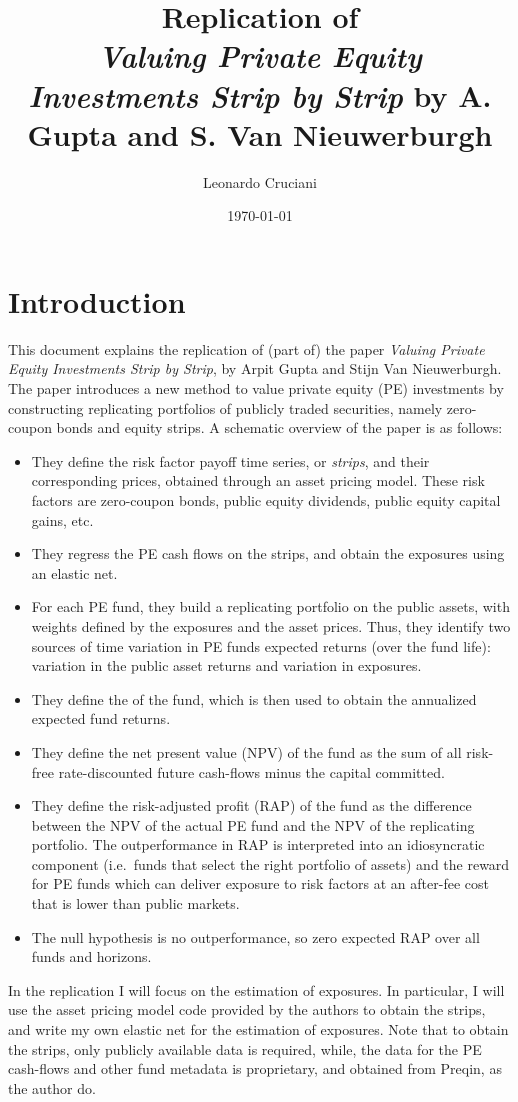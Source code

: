 \documentclass[12pt]{article}
\title{Replication of\\\textit{Valuing Private Equity Investments Strip by Strip} by A. Gupta and S. Van Nieuwerburgh}
\author{Leonardo Cruciani}
\date{\today}
\begin{document}
\maketitle

\section{Introduction}\label{sec:introduction}
This document explains the replication of (part of) the paper \textit{Valuing Private Equity Investments Strip by Strip}, by Arpit Gupta and Stijn Van Nieuwerburgh.
The paper introduces a new method to value private equity (PE) investments by constructing replicating portfolios of publicly traded securities, namely zero-coupon bonds and equity strips.
A schematic overview of the paper is as follows:
\begin{itemize}
    \item They define the risk factor payoff time series, or \textit{strips}, and their corresponding prices, obtained through an asset pricing model.
    These risk factors are zero-coupon bonds, public equity dividends, public equity capital gains, etc.
    \item They regress the PE cash flows on the strips, and obtain the exposures using an elastic net.
    \item For each PE fund, they build a replicating portfolio on the public assets, with weights defined by the exposures and the asset prices.
    Thus, they identify two sources of time variation in PE funds expected returns (over the fund life): variation in the public asset returns and variation in exposures.
    \item They define the  of the fund, which is then used to obtain the annualized expected fund returns.
    \item They define the net present value (NPV) of the fund as the sum of all risk-free rate-discounted future cash-flows minus the capital committed.
    \item They define the risk-adjusted profit (RAP) of the fund as the difference between the NPV of the actual PE fund and the NPV of the replicating portfolio.
    The outperformance in RAP is interpreted into an idiosyncratic component (i.e.\ funds that select the right portfolio of assets) and the reward for PE funds which can deliver exposure to risk factors at an after-fee cost that is lower than public markets.
    \item The null hypothesis is no outperformance, so zero expected RAP over all funds and horizons.
\end{itemize}
In the replication I will focus on the estimation of exposures.
In particular, I will use the asset pricing model code provided by the authors to obtain the strips, and write my own elastic net for the estimation of exposures.
Note that to obtain the strips, only publicly available data is required, while, the data for the PE cash-flows and other fund metadata is proprietary, and obtained from Preqin, as the author do.
\end{document}
